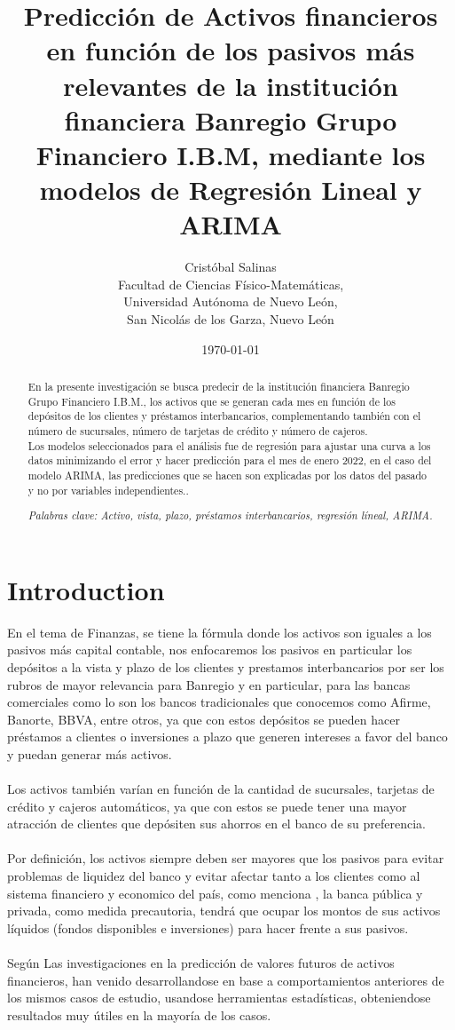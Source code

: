 \documentclass{article}
\title{Predicción de Activos financieros en función de los pasivos más relevantes de la institución financiera Banregio Grupo Financiero I.B.M, mediante los modelos de Regresión Lineal y ARIMA}
\author{Cristóbal Salinas \\ 
        Facultad de Ciencias Físico-Matemáticas, \\Universidad Autónoma de Nuevo León, \\San Nicolás de los Garza, Nuevo León}
\date{\today}
\begin{document}
\maketitle

\begin{abstract}

En la presente investigación se busca predecir de la institución financiera Banregio Grupo Financiero I.B.M., los activos que se generan cada mes en función de los depósitos de los clientes y préstamos interbancarios, complementando también con el número de sucursales, número de tarjetas de crédito y número de cajeros. \\

Los modelos seleccionados para el análisis fue de regresión para ajustar una curva a los datos minimizando el error y hacer predicción para el mes de enero 2022, en el caso del modelo ARIMA, las predicciones que se hacen son explicadas por los datos del pasado y no por variables independientes..

\textit{Palabras clave: Activo, vista, plazo, préstamos interbancarios, regresión líneal, ARIMA.}

\end{abstract}

\section{Introduction}

En el tema de Finanzas, se tiene la fórmula donde los activos son iguales a los pasivos más capital contable, nos enfocaremos los pasivos en particular los depósitos a la vista y plazo de los clientes y prestamos interbancarios por ser los rubros de mayor relevancia para Banregio y en particular, para las bancas comerciales como lo son los bancos tradicionales que conocemos como Afirme, Banorte, BBVA, entre otros, ya que con estos depósitos se pueden hacer préstamos a clientes o inversiones a plazo que generen intereses a favor del banco y puedan generar más activos.
\\
\\
Los activos también varían en función de la cantidad de sucursales, tarjetas de crédito y cajeros automáticos, ya que con estos se puede tener una mayor atracción de clientes que depósiten sus ahorros en el banco de su preferencia.
\\
\\
Por definición, los activos siempre deben ser mayores que los pasivos para evitar problemas de liquidez del banco y evitar afectar tanto a los clientes como al sistema financiero y economico del país, como menciona \citet{mu2021}, la banca pública y privada, como medida precautoria, tendrá que ocupar los montos de sus activos líquidos (fondos disponibles e inversiones) para hacer frente a sus pasivos.
\\
\\
Según \citet{san12} Las investigaciones en la predicción de valores futuros de activos financieros, han venido desarrollandose en base a comportamientos anteriores de los mismos casos de estudio, usandose herramientas estadísticas, obteniendose resultados muy útiles en la mayoría de los casos.
\end{document}
